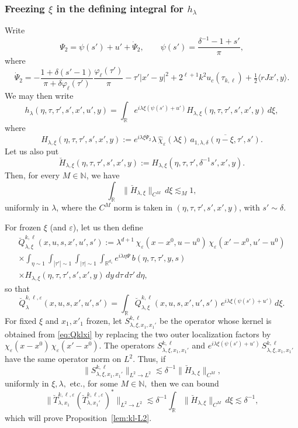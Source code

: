 \documentclass[leqno]{amsart}
\theoremstyle{definition}
\theoremstyle{remark}
\numberwithin{equation}{section}
\newcommand{\R}{\mathbb{R}}
\newcommand{\N}{\mathbb{N}}
\renewcommand{\hat}{\widehat}
\newcommand\la{{\lambda}}
\newcommand\ve{{\varepsilon}}
\newcommand\de{{\delta}}
\begin{document}
\subsubsection{Freezing $\xi$ in the defining integral for $h_\la$} 
Write 
\[
\Psi_2=\psi(s')+u'+\dot\Psi_2,
\qquad
\psi(s')=\frac{\delta^{-1}-1+s'}{\pi},
\]
where
\[
\dot \Psi_2
= -\frac{1+\delta(s'-1)}{\pi + \delta \varphi_\ell(\tau')}\frac {\varphi_\ell(\tau')}{\pi} - \tau'\left|x'-y\right|^2  +
2^{\ell+1} k^2 u_c(\tau_{k,\ell} ) + \tfrac 1 2 \langle rJx',y\rangle.
\]
We may then write
\begin{equation}\label{hladecomp}
h_\lambda(\eta,\tau,\tau',s',x',u',y)
=
\int_\R
e^{i\la\xi(\psi(s')+u')}
H_{\la,\xi}(\eta,\tau,\tau',s',x',y)\,d\xi,
\end{equation}
where
\[
H_{\la,\xi}(\eta,\tau,\tau',s',x',y)
:=
e^{i\la\xi\dot\Psi_2}
\lambda\,\hat\chi_\varepsilon(\lambda\xi)\,
\overline{a_{1,\la,\de}(\eta-\xi,\tau',s')}.
\]
Let us also put
\[
\breve H_{\la,\xi}(\eta,\tau,\tau',s',x',y)
:=
H_{\la,\xi}(\eta,\tau,\tau',\delta^{-1}s',x',y).
\]
Then, for every $M\in\N$, we have
\begin{equation}\label{tildeH}
\int_\R \|\breve H_{\la,\xi}\|_{C^M}\,d\xi
\lesssim_M 1,
\end{equation}
uniformly in $\la$, where the $C^M$ norm is taken in $(\eta,\tau,\tau',s',x',y)$, with $s'\sim \delta$.

For frozen $\xi$ (and $\ve$), let us then define
\begin{multline}\label{eq:Qklxi}
\breve Q^{k,\ell}_{\lambda,\xi}(x,u,s,x',u',s')
 := \lambda^{d+1}\,\chi_\varepsilon(x-x^0,u-u^0)\,\chi_\varepsilon(x'-x^0,u'-u^0)\\   \times \int_{\eta\sim 1} \int_{|\tau'|\sim 1} \int_{|\tau|\sim 1} \int_{\R^{d_1}} e^{i\lambda \eta \Psi} \, b(\eta,\tau,\tau',y,s)\\
\times H_{\la,\xi}(\eta,\tau,\tau',s',x',y)\,
 dy \, d\tau \, d\tau' \, d\eta, 
\end{multline}
so that
\[
\breve Q^{k,\ell,\varepsilon}_{\lambda}(x,u,s,x',u',s')=\int_\R \breve Q^{k,\ell}_{\lambda,\xi}(x,u,s,x',u',s') \, e^{i\la\xi(\psi(s')+u')} \, d\xi.
\]
For fixed $\xi$ and $x_1,x'_1$ frozen, let $S_{\lambda,\xi,x_1,x_1'}^{k,\ell}$ be the operator whose kernel is obtained from \eqref{eq:Qklxi} by replacing the two outer localization factors by $\chi_\varepsilon(x-x^0)\,\chi_\varepsilon(x'-x^0)$. The operators $S_{\lambda,\xi,x_1,x_1'}^{k,\ell}$ and $e^{i\la  \xi(\psi(s')+u')}\,S_{\lambda,\xi,x_1,x_1'}^{k,\ell}$ have the same operator norm on $L^2$. Thus, if
\begin{equation}\label{estxix1}
\|S_{\lambda,\xi,x_1,x_1'}^{k,\ell}\|_{L^2\to L^2}\lesssim \delta^{-1} \|\breve H_{\la,\xi}\|_{C^M},
\end{equation}
uniformly in $\xi,\la,$ etc., for some $M\in\N,$ then we can bound 
\[
\|\breve T_{\lambda,x_1}^{k,\ell,\varepsilon}
(\breve T_{\lambda,x_1'}^{k,\ell,\varepsilon})^*\|_{L^2\to L^2}\lesssim \delta^{-1}\int_\R \|\breve H_{\la,\xi}\|_{C^M}\, d\xi
\lesssim \delta^{-1},
\]
which will prove Proposition~\ref{lem:kl-L2}.
\end{document}
